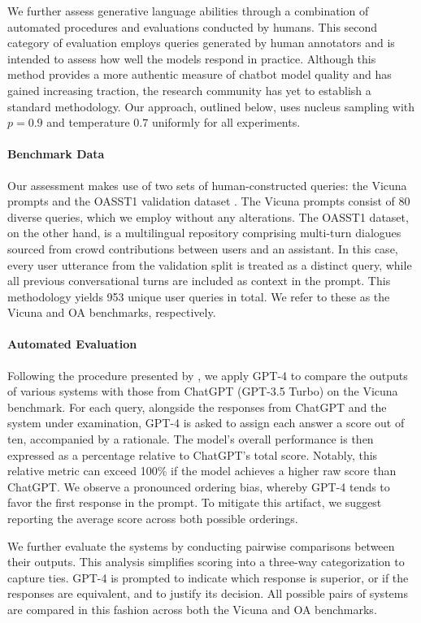 We further assess generative language abilities through a combination of automated procedures and evaluations conducted by humans. This second category of evaluation employs queries generated by human annotators and is intended to assess how well the models respond in practice. Although this method provides a more authentic measure of chatbot model quality and has gained increasing traction, the research community has yet to establish a standard methodology. Our approach, outlined below, uses nucleus sampling with $p=0.9$ and temperature $0.7$ uniformly for all experiments.

\paragraph{Benchmark Data} Our assessment makes use of two sets of human-constructed queries: the Vicuna prompts \citep{vicuna2023} and the OASST1 validation dataset \citep{kopf2023openassistant}. The Vicuna prompts consist of 80 diverse queries, which we employ without any alterations. The OASST1 dataset, on the other hand, is a multilingual repository comprising multi-turn dialogues sourced from crowd contributions between users and an assistant. In this case, every user utterance from the validation split is treated as a distinct query, while all previous conversational turns are included as context in the prompt. This methodology yields 953 unique user queries in total. We refer to these as the Vicuna and OA benchmarks, respectively.

\paragraph{Automated Evaluation} Following the procedure presented by \citet{vicuna2023}, we apply GPT-4 to compare the outputs of various systems with those from ChatGPT (GPT-3.5 Turbo) on the Vicuna benchmark. For each query, alongside the responses from ChatGPT and the system under examination, GPT-4 is asked to assign each answer a score out of ten, accompanied by a rationale. The model’s overall performance is then expressed as a percentage relative to ChatGPT’s total score. Notably, this relative metric can exceed 100\% if the model achieves a higher raw score than ChatGPT. We observe a pronounced ordering bias, whereby GPT-4 tends to favor the first response in the prompt. To mitigate this artifact, we suggest reporting the average score across both possible orderings.

We further evaluate the systems by conducting pairwise comparisons between their outputs. This analysis simplifies scoring into a three-way categorization to capture ties. GPT-4 is prompted to indicate which response is superior, or if the responses are equivalent, and to justify its decision. All possible pairs of systems are compared in this fashion across both the Vicuna and OA benchmarks.

